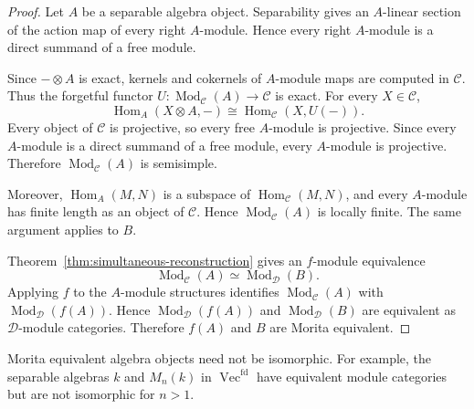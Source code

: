 \documentclass[11pt]{amsart}
\newcommand{\C}{\mathcal C}
\newcommand{\D}{\mathcal D}
\newcommand{\Vect}{\operatorname{Vec}}
\newcommand{\Mod}{\operatorname{Mod}}
\DeclareMathOperator{\Hom}{Hom}
\theoremstyle{definition}
\theoremstyle{remark}
\theoremstyle{plain}
\begin{document}
\begin{proof}
Let $A$ be a separable algebra object. Separability gives an $A$-linear section of the action map of every right $A$-module. Hence every right $A$-module is a direct summand of a free module.

Since $-\otimes A$ is exact, kernels and cokernels of $A$-module maps are computed in $\C$. Thus the forgetful functor $U\colon\Mod_{\C}(A)\to\C$ is exact. For every $X\in\C$,
\[
\Hom_A(X\otimes A,-)\cong\Hom_{\C}(X,U(-)).
\]
Every object of $\C$ is projective, so every free $A$-module is projective. Since every $A$-module is a direct summand of a free module, every $A$-module is projective. Therefore $\Mod_{\C}(A)$ is semisimple.

Moreover, $\Hom_A(M,N)$ is a subspace of $\Hom_{\C}(M,N)$, and every $A$-module has finite length as an object of $\C$. Hence $\Mod_{\C}(A)$ is locally finite. The same argument applies to $B$.

Theorem~\ref{thm:simultaneous-reconstruction} gives an $f$-module equivalence
\[
\Mod_{\C}(A)\simeq\Mod_{\D}(B).
\]
Applying $f$ to the $A$-module structures identifies $\Mod_{\C}(A)$ with $\Mod_{\D}(f(A))$. Hence $\Mod_{\D}(f(A))$ and $\Mod_{\D}(B)$ are equivalent as $\D$-module categories. Therefore $f(A)$ and $B$ are Morita equivalent.
\end{proof}

Morita equivalent algebra objects need not be isomorphic. For example, the separable algebras $k$ and $M_n(k)$ in $\Vect^{\mathrm{fd}}$ have equivalent module categories but are not isomorphic for $n>1$.
\end{document}
